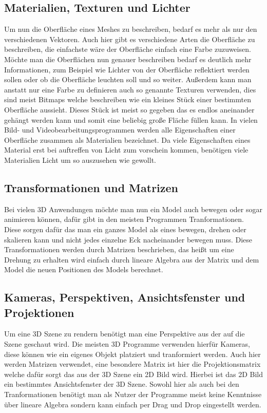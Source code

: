 \subsection{Materialien, Texturen und Lichter}
Um nun die Oberfläche eines Meshes zu beschreiben, bedarf es mehr als nur den verschiedenen Vektoren.
Auch hier gibt es verschiedene Arten die Oberfläche zu beschreiben, die einfachste wäre der Oberfläche einfach eine Farbe zuzuweisen.
Möchte man die Oberflächen nun genauer beschreiben bedarf es deutlich mehr Informationen, zum Beispiel wie Lichter von der Oberfläche reflektiert werden sollen oder ob die Oberfläche leuchten soll und so weiter.
Außerdem kann man anstatt nur eine Farbe zu definieren auch so genannte Texturen verwenden, dies sind meist Bitmaps welche beschreiben wie ein kleines Stück einer bestimmten Oberfläche aussieht.
Dieses Stück ist meist so gegeben das es endlos aneinander gehängt werden kann und somit eine beliebig große Fläche füllen kann.
In vielen Bild- und Videobearbeitungsprogrammen werden alle Eigenschaften einer Oberfläche zusammen als Materialien bezeichnet.
Da viele Eigenschaften eines Material erst bei auftreffen von Licht zum vorschein kommen, benötigen viele Materialien Licht um so auszusehen wie gewollt.\cite[5]{parisi2012webgl} 

\subsection{Transformationen und Matrizen}
Bei vielen 3D Anwendungen möchte man nun ein Model auch bewegen oder sogar animieren können, dafür gibt in den meisten Programmen Tranformationen.
Diese sorgen dafür das man ein ganzes Model als eines bewegen, drehen oder skalieren kann und nicht jedes einzelne Eck nacheinander bewegen muss.
Diese Transformationen werden durch Matrizen beschrieben, das heißt um eine Drehung zu erhalten wird einfach durch lineare Algebra aus der Matrix und dem Model die neuen Positionen des Models berechnet. \cite[6,7]{parisi2012webgl}

\subsection{Kameras, Perspektiven, Ansichtsfenster und Projektionen}
Um eine 3D Szene zu rendern benötigt man eine Perspektive aus der auf die Szene geschaut wird.
Die meisten 3D Programme verwenden hierfür Kameras, diese können wie ein eigenes Objekt platziert und tranformiert werden.
Auch hier werden Matrizen verwendet, eine besondere Matrix ist hier die Projektionsmatrix welche dafür sorgt das aus der 3D Szene ein 2D Bild wird.
Hierbei ist das 2D Bild ein bestimmtes Ansichtsfenster der 3D Szene.
Sowohl hier als auch bei den Tranformationen benötigt man als Nutzer der Programme meist keine Kenntnisse über lineare Algebra sondern kann einfach per Drag und Drop eingestellt werden.\cite[7]{parisi2012webgl}


